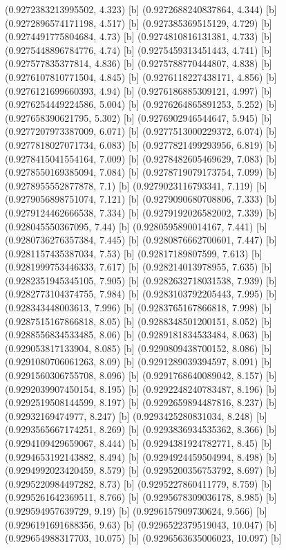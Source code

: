 {{{(0.9272383213995502, 4.323) [b] 
(0.9272688240837864, 4.344) [b] 
(0.9272896574171198, 4.517) [b] 
(0.927385369515129, 4.729) [b] 
(0.9274491775804684, 4.73) [b] 
(0.9274810816131381, 4.733) [b] 
(0.9275448896784776, 4.74) [b] 
(0.9275459313451443, 4.741) [b] 
(0.927577835377814, 4.836) [b] 
(0.9275788770444807, 4.838) [b] 
(0.9276107810771504, 4.845) [b] 
(0.9276118227438171, 4.856) [b] 
(0.9276121699660393, 4.94) [b] 
(0.9276186885309121, 4.997) [b] 
(0.9276254449224586, 5.004) [b] 
(0.9276264865891253, 5.252) [b] 
(0.927658390621795, 5.302) [b] 
(0.9276902946544647, 5.945) [b] 
(0.9277207973387009, 6.071) [b] 
(0.9277513000229372, 6.074) [b] 
(0.9277818027071734, 6.083) [b] 
(0.9277821499293956, 6.819) [b] 
(0.9278415041554164, 7.009) [b] 
(0.9278482605469629, 7.083) [b] 
(0.9278550169385094, 7.084) [b] 
(0.9278719079173754, 7.099) [b] 
(0.9278955552877878, 7.1) [b] 
(0.9279023116793341, 7.119) [b] 
(0.9279056898751074, 7.121) [b] 
(0.9279090680708806, 7.333) [b] 
(0.9279124462666538, 7.334) [b] 
(0.9279192026582002, 7.339) [b] 
(0.928045550367095, 7.44) [b] 
(0.9280595890014167, 7.441) [b] 
(0.9280736276357384, 7.445) [b] 
(0.9280876662700601, 7.447) [b] 
(0.9281157435387034, 7.53) [b] 
(0.92817189807599, 7.613) [b] 
(0.9281999753446333, 7.617) [b] 
(0.928214013978955, 7.635) [b] 
(0.9282351945345105, 7.905) [b] 
(0.9282632718031538, 7.939) [b] 
(0.9282773104374755, 7.984) [b] 
(0.9283103792205443, 7.995) [b] 
(0.928343448003613, 7.996) [b] 
(0.9283765167866818, 7.998) [b] 
(0.9287515167866818, 8.05) [b] 
(0.9288348501200151, 8.052) [b] 
(0.9288556834533485, 8.06) [b] 
(0.9289181834533484, 8.063) [b] 
(0.929053817133904, 8.085) [b] 
(0.9290809438700152, 8.086) [b] 
(0.9291080706061263, 8.09) [b] 
(0.9291289039394597, 8.091) [b] 
(0.9291560306755708, 8.096) [b] 
(0.9291768640089042, 8.157) [b] 
(0.9292039907450154, 8.195) [b] 
(0.9292248240783487, 8.196) [b] 
(0.9292519508144599, 8.197) [b] 
(0.9292659894487816, 8.237) [b] 
(0.92932169474977, 8.247) [b] 
(0.9293425280831034, 8.248) [b] 
(0.9293565667174251, 8.269) [b] 
(0.9293836934535362, 8.366) [b] 
(0.9294109429659067, 8.444) [b] 
(0.9294381924782771, 8.45) [b] 
(0.9294653192143882, 8.494) [b] 
(0.9294924459504994, 8.498) [b] 
(0.9294992023420459, 8.579) [b] 
(0.9295200356753792, 8.697) [b] 
(0.9295220984497282, 8.73) [b] 
(0.9295227860411779, 8.759) [b] 
(0.9295261642369511, 8.766) [b] 
(0.9295678309036178, 8.985) [b] 
(0.929594957639729, 9.19) [b] 
(0.9296157909730624, 9.566) [b] 
(0.9296191691688356, 9.63) [b] 
(0.9296522379519043, 10.047) [b] 
(0.929654988317703, 10.075) [b] 
(0.9296563635006023, 10.097) [b] 
}}}
